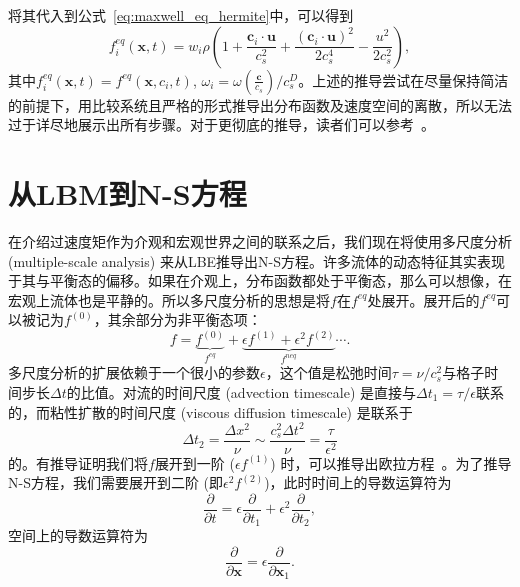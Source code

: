 将其代入到公式~\ref{eq:maxwell_eq_hermite}中，可以得到
\begin{equation}
    f_i^{eq}(\boldsymbol{x}, t)=w_i \rho\left(1+\frac{\mathbf{c}_i \cdot \boldsymbol{u}}{c_s^2}+\frac{\left(\mathbf{c}_i \cdot \boldsymbol{u}\right)^2}{2 c_s^4}-\frac{u^2}{2 c_s^2}\right),
    \label{eq:f_eq_o2}
\end{equation}
其中$f_i^{eq}(\boldsymbol{x}, t)=f^{eq}(\boldsymbol{x}, {c}_i, t)$, $\omega_i=\omega(\frac{\mathbf{c}}{c_s})/c_s^D$。上述的推导尝试在尽量保持简洁的前提下，用比较系统且严格的形式推导出分布函数及速度空间的离散，所以无法过于详尽地展示出所有步骤。对于更彻底的推导，读者们可以参考~\citep{shan2006kinetic, malaspinas2010lattice}。


\section{从LBM到N-S方程}
\label{sec:lbm_to_ns}
在介绍过速度矩作为介观和宏观世界之间的联系之后，我们现在将使用多尺度分析 (multiple-scale analysis) 来从LBE推导出N-S方程。许多流体的动态特征其实表现于其与平衡态的偏移。如果在介观上，分布函数都处于平衡态，那么可以想像，在宏观上流体也是平静的。所以多尺度分析的思想是将$f$在$f^{eq}$处展开。展开后的$f^{eq}$可以被记为$f^{(0)}$，其余部分为非平衡态项：
\begin{equation}
    f=\underbrace{f^{(0)}}_{f^{e q}}+\underbrace{\epsilon f^{(1)}+\epsilon^2 f^{(2)}}_{f^{n e q}} \cdots .
\end{equation}
多尺度分析的扩展依赖于一个很小的参数$\epsilon$，这个值是松弛时间$\tau=\nu/c_s^2$与格子时间步长$\Delta t$的比值。对流的时间尺度 (advection timescale) 是直接与$\Delta t_1=\tau/\epsilon$联系的，而粘性扩散的时间尺度 (viscous diffusion timescale) 是联系于
\begin{equation}
    \Delta t_2=\frac{\Delta x^2}{\nu} \sim \frac{c_s^2 \Delta t^2}{\nu}=\frac{\tau}{\epsilon^2}
    \label{eq:ms_f}
\end{equation}
的。有推导证明我们将$f$展开到一阶 ($\epsilon f^{(1)}$) 时，可以推导出欧拉方程~\citep{huang2008statistical}。为了推导N-S方程，我们需要展开到二阶 (即$\epsilon^2 f^{(2)}$)，此时时间上的导数运算符为
\begin{equation}
    \frac{\partial}{\partial t}=\epsilon \frac{\partial}{\partial t_1}+\epsilon^2 \frac{\partial}{\partial t_2},
    \label{eq:ms_t}
\end{equation}
空间上的导数运算符为
\begin{equation}
    \frac{\partial}{\partial \boldsymbol{x}}=\epsilon \frac{\partial}{\partial \boldsymbol{x}_1}.
    \label{eq:ms_x}
\end{equation}
